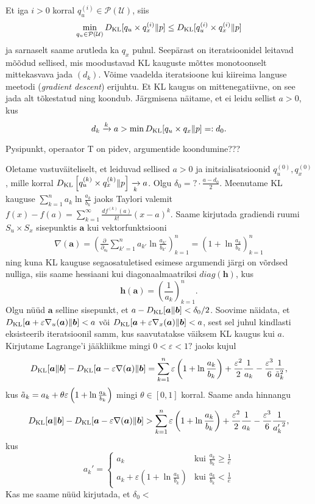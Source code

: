 Et iga $i>0$ korral $q_u^{(i)} \in \mathcal{P}(\mathcal{U})$, siis
$$ \min_{q_u \in \mathcal{P}(\mathcal{U})} D_{\mathrm{KL}}[q_u \times q_x^{(i)} \| p] \le D_{\mathrm{KL}}[q_u^{(i)} \times q_x^{(i)} \| p]$$
ja sarnaselt saame arutleda ka $q_x$ puhul. Seepärast on iteratsioonidel leitavad mõõdud sellised, mis moodustavad KL kauguste mõttes monotoonselt mittekasvava jada $(d_k)$. Võime vaadelda iteratsioone kui kiireima languse meetodi (\emph{gradient descent}) erijuhtu. Et KL kaugus on mittenegatiivne, on see jada alt tõkestatud ning koondub. Järgmisena näitame, et ei leidu sellist $a>0$, kus
$$d_k \xrightarrow[]{k} a > \min D_{\mathrm{KL}}[q_u \times q_x \| p] =: d_0.$$

Pysipunkt, operaator T on pidev, argumentide koondumine???

Oletame vastuväiteliselt, et leiduvad sellised $a > 0$ ja initsialisatsioonid $q_u^{(0)}, q_x^{(0)}$, mille korral $D_{\mathrm{KL}} \left[ q_u^{(k)} \times q_x^{(k)} \| p \right] \xrightarrow[k]{} a$.  Olgu $\delta_0 = ? \cdot \frac{a - d_0}{2}$. Meenutame KL kauguse $\sum_{k=1}^n a_k \ln \frac{a_k}{b_k}$ jaoks Taylori valemit $f(x)-f(a) = \sum_{k=1}^{\infty} \frac{df^{(k)}(a)}{k!}(x-a)^k$. Saame kirjutada gradiendi ruumi $S_u \times S_x$ sisepunktis $\bm{a}$ kui vektorfunktsiooni
\begin{align*}
    \nabla (\bm{a}) = \left( \frac{\partial}{\partial_{a_k}} \sum_{k'=1}^n a_{k'} \ln \frac{a_{k'}}{b_{k'}}\right)_{k=1}^n = \left( 1 +\ln \frac{a_k}{b_k}\right)_{k=1}^n
\end{align*}
ning kuna KL kauguse segaosatuletised esimese argumendi järgi on võrdsed nulliga, siis saame hessiaani kui diagonaalmaatriksi $diag(\bm{h})$, kus
$$\bm{h}(\bm{a}) = \left(\frac{1}{a_k} \right)_{k=1}^n.$$
Olgu nüüd $\bm{a}$ selline sisepunkt, et $a - D_{\mathrm{KL}}[\bm{a}\|\bm{b}] < \delta_0/2$. Soovime näidata, et $D_{\mathrm{KL}}[\bm{a} + \varepsilon \nabla_u(\bm{a})\|\bm{b}] < a$ või $D_{\mathrm{KL}}[\bm{a} + \varepsilon \nabla_x(\bm{a})\|\bm{b}] < a$, sest sel juhul kindlasti eksisteerib iteratsioonil samm, kus saavutatakse väiksem KL kaugus kui $a$. Kirjutame Lagrange'i jääkliikme mingi $0 < \varepsilon < 1?$ jaoks kujul
\begin{align*}
    D_{\mathrm{KL}}[\bm{a} \| \bm{b}] - D_{\mathrm{KL}}[\bm{a} - \varepsilon \nabla(\bm{a}) \| \bm{b}] = \sum_{k=1}^n \varepsilon \left(1+ \ln \frac{a_k}{b_k}\right) + \frac{\varepsilon^2}{2} \frac{1}{a_k} - \frac{\varepsilon^3}{6} \frac{1}{\Tilde{a}_k^2},
\end{align*}
kus $\Tilde{a}_k = a_k + \theta \varepsilon \left( 1+ \ln \frac{a_k}{b_k} \right)$ mingi $\theta \in [0,1]$  korral. Saame anda hinnangu
\begin{align*}
    D_{\mathrm{KL}}[\bm{a} \| \bm{b}] - D_{\mathrm{KL}}[\bm{a} - \varepsilon \nabla(\bm{a}) \| \bm{b}] > \sum_{k=1}^n \varepsilon \left(1+ \ln \frac{a_k}{b_k}\right) + \frac{\varepsilon^2}{2} \frac{1}{a_k} - \frac{\varepsilon^3}{6} \frac{1}{{a_k'}^2},
\end{align*}
kus 
$$a_k' = 
\begin{cases}
    a_k & \text{kui } \frac{a_k}{b_k} \ge \frac{1}{e}\\
    a_k + \varepsilon ( 1+ \ln \frac{a_k}{b_k}) & \text{kui } \frac{a_k}{b_k} < \frac{1}{e}
    \end{cases}    $$
Kas me saame nüüd kirjutada, et $\delta_0 <  $


